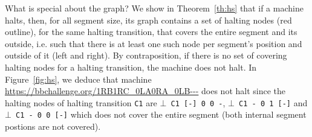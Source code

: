 What is special about the \HS graph? We show in Theorem~\ref{th:hs} that if a machine halts, then, for all segment size, its \HS graph contains a set of halting nodes (red outline), for the same halting transition, that covers the entire segment and its outside, i.e. such that there is at least one such node per segment's position and outside of it (left and right). By contraposition, if there is no set of covering halting nodes for a halting transition, the machine does not halt. In Figure~\ref{fig:hs}, we deduce that machine \url{https://bbchallenge.org/1RB1RC_0LA0RA_0LB---} does not halt since the halting nodes of halting transition \texttt{C1} are \texttt{$\bot$ C1 [-] 0 0 -}, \texttt{$\bot$ C1 - 0 1 [-]} and \texttt{$\bot$ C1 - 0 0 [-]} which does not cover the entire segment (both internal segment postions are not covered).
